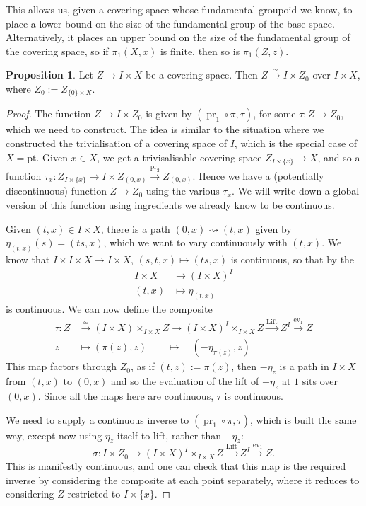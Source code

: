 \documentclass{tufte-handout}
\def\pt {\mathrm{pt}}
\DeclareMathOperator{\pr}{pr}
\DeclareMathOperator{\ev}{ev}
\DeclareMathOperator{\Lift}{Lift}
\theoremstyle{definition}
\newtheorem{prop}{Proposition}
\begin{document}
This allows us, given a covering space whose fundamental groupoid we know, to place a 
lower bound on the size of the fundamental group of the base space. Alternatively, it 
places an upper bound on the size of the fundamental group of the covering space, so if 
$\pi_1(X,x)$ is finite, then so is $\pi_1(Z,z)$.

\begin{prop}\label{prop:cov_space_of_IxX}
Let $Z\to I\times X$ be a covering space. Then $Z\xrightarrow{\simeq} I\times Z_0$ over 
$I\times X$, where $Z_0 := Z_{\{0\}\times X}$.
\end{prop}

\begin{proof}
The function $Z\to I\times Z_0$ is given by $(\pr_1\circ \pi,\tau)$, for some 
$\tau\colon Z\to Z_0$, which we need to construct.
The idea is similar to the situation where we constructed the trivialisation of a 
covering space of $I$, which is the special case of $X=\pt$. 
Given $x\in X$, we get a trivisalisable covering space $Z_{I\times \{x\}}\to X$, and so 
a function $\tau_x\colon Z_{I\times \{x\}} \to I\times Z_{(0,x)} \xrightarrow{\pr_2}Z_{(0,x)}$. 
Hence we have a (potentially discontinuous) function $Z \to Z_0$ using the various $\tau_x$. 
We will write down a global version of this function using ingredients we already know to be 
continuous.

Given $(t,x)\in I\times X$, there is a path $(0,x) \rightsquigarrow (t,x)$ given by
$\eta_{(t,x)}(s) = (ts,x)$, which we want to vary continuously with $(t,x)$. We know that 
$I\times I \times X\to I\times X$, $(s,t,x) \mapsto (ts,x)$ is continuous, so that by the 
\begin{align*}
	I\times X & \to (I\times X)^I\\
	(t,x) & \mapsto \eta_{(t,x)}
\end{align*}
is continuous. We can now define the composite
\begin{align*}
	\tau\colon Z & \xrightarrow{\simeq} (I\times X)\times_{I\times X} Z \to (I\times X)^I \times_{I\times X} Z 
	\xrightarrow{\Lift} Z^I\xrightarrow{\ev_1} Z\\
	z&\mapsto (\pi(z),z)\qquad \mapsto\quad (-\eta_{\pi(z)},z)
\end{align*}
This map factors through $Z_0$, as if $(t,z) :=\pi(z)$, then $-\eta_z$ is a path in $I\times X$ 
from $(t,x)$ to $(0,x)$ and so the evaluation of the lift of $-\eta_z$ at $1$ sits over $(0,x)$.
Since all the maps here are continuous, $\tau$ is continuous.

We need to supply a continuous inverse to $(\pr_1\circ \pi,\tau)$, which is built the 
same way, except now using $\eta_z$ itself to lift, rather than $-\eta_z$:
\[
	\sigma\colon I\times Z_0 \to (I\times X)^I\times_{I\times X} Z \xrightarrow{\Lift}
	Z^I \xrightarrow{\ev_1} Z.
\]
This is manifestly continuous, and one can check that this map is the required inverse by
considering the composite at each point separately, where it reduces to considering $Z$ 
restricted to $I\times \{x\}$.
\end{proof}
\end{document}
